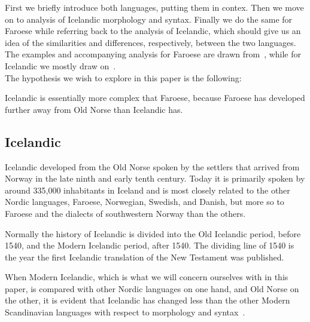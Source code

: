 \documentclass[12pt,%
    times,
]{lin-v2/lin}
\begin{document}
First we briefly introduce both languages, putting them in contex. Then we move on to analysis of Icelandic morphology and syntax.
Finally we do the same for Faroese while referring back to the analysis of Icelandic, which should give us an idea of
the similarities and differences, respectively, between the two languages.
The examples and accompanying analysis for Faroese are drawn from~\citep{faroese},
while for Icelandic we mostly draw on~\citep{icelandic}.\\


The hypothesis we wish to explore in this paper is the following:
\begin{exe}
    \ex
    Icelandic is essentially more complex that Faroese,
    because Faroese has developed further away from Old Norse than Icelandic has.
\end{exe}






\subsection{Icelandic}

Icelandic developed from the Old Norse spoken by the settlers that arrived from Norway
in the late ninth and early tenth century. Today it is primarily spoken by around 335,000
inhabitants in Iceland and is most closely related to the other Nordic languages, Faroese, Norwegian, Swedish, and Danish,
but more so to Faroese and the dialects of southwestern Norway than the others.

Normally the history of Icelandic is divided into the Old Icelandic period, before 1540,
and the Modern Icelandic period, after 1540. The dividing line of 1540 is the year
the first Icelandic translation of the New Testament was published.

When Modern Icelandic, which is what we will concern ourselves with in this paper,
is compared with other Nordic languages on one hand, and Old Norse on the other,
it is evident that Icelandic has changed less than the other
Modern Scandinavian languages with respect to morphology and
syntax~\citep{icelandic, germanicIcelandic}.
\end{document}
